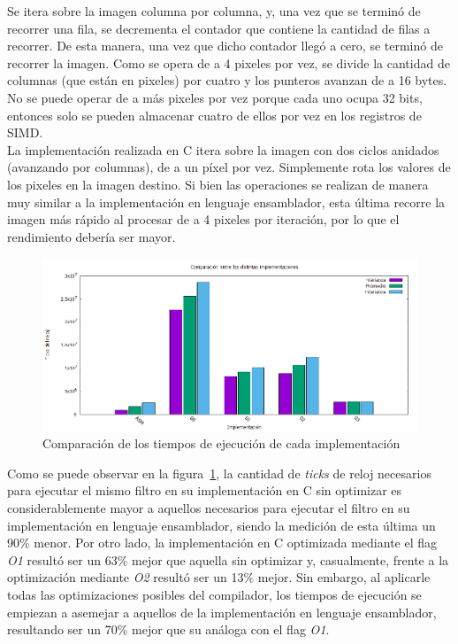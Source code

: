 \documentclass[a4paper]{article}
\begin{document}
Se itera sobre la imagen columna por columna, y, una vez que se terminó de recorrer una fila, se decrementa el contador que contiene la cantidad de filas a recorrer. De esta manera, una vez que dicho contador llegó a cero, se terminó de recorrer la imagen. Como se opera de a 4 pixeles por vez, se divide la cantidad de columnas (que están en pixeles) por cuatro y los punteros avanzan de a 16 bytes. No se puede operar de a más pixeles por vez porque cada uno ocupa 32 bits, entonces solo se pueden almacenar cuatro de ellos por vez en los registros de SIMD.\\


La implementación realizada en C itera sobre la imagen con dos ciclos anidados (avanzando por columnas), de a un píxel por vez. Simplemente rota los valores de los pixeles en la imagen destino. Si bien las operaciones se realizan de manera muy similar a la implementación en lenguaje ensamblador, esta última recorre la imagen más rápido al procesar de a 4 pixeles por iteración, por lo que el rendimiento debería ser mayor.\\

\begin{figure}[H]
  \begin{center}
	\includegraphics[scale=0.66]{imagenes/rotarC.png}
	\caption{Comparación de los tiempos de ejecución de cada implementación}
	\label{rotar_asmvsc}
  \end{center}
\end{figure}

Como se puede observar en la figura~\ref{rotar_asmvsc}, la cantidad de \textit{ticks} de reloj necesarios para ejecutar el mismo filtro en su implementación en C sin optimizar es considerablemente mayor a aquellos necesarios para ejecutar el filtro en su implementación en lenguaje ensamblador, siendo la medición de esta última un 90\% menor. Por otro lado, la implementación en C optimizada mediante el flag \textit{O1} resultó ser un 63\% mejor que aquella sin optimizar y, casualmente, frente a la optimización mediante \textit{O2} resultó ser un 13\% mejor. Sin embargo, al aplicarle todas las optimizaciones posibles del compilador, los tiempos de ejecución se empiezan a asemejar a aquellos de la implementación en lenguaje ensamblador, resultando ser un 70\% mejor que su análoga con el flag \textit{O1}.
\end{document}
